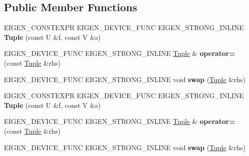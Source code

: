 \subsection*{Public Member Functions}
\begin{DoxyCompactItemize}
\item 
\mbox{\label{struct_eigen_1_1_tuple_a735678943e6123e4563fa87dbf0314f0}} 
E\+I\+G\+E\+N\+\_\+\+C\+O\+N\+S\+T\+E\+X\+PR E\+I\+G\+E\+N\+\_\+\+D\+E\+V\+I\+C\+E\+\_\+\+F\+U\+NC E\+I\+G\+E\+N\+\_\+\+S\+T\+R\+O\+N\+G\+\_\+\+I\+N\+L\+I\+NE {\bfseries Tuple} (const U \&f, const V \&s)
\item 
\mbox{\label{struct_eigen_1_1_tuple_a9bad774fdccb8664c0dc2a4ff05b11d4}} 
E\+I\+G\+E\+N\+\_\+\+D\+E\+V\+I\+C\+E\+\_\+\+F\+U\+NC E\+I\+G\+E\+N\+\_\+\+S\+T\+R\+O\+N\+G\+\_\+\+I\+N\+L\+I\+NE \hyperlink{struct_eigen_1_1_tuple}{Tuple} \& {\bfseries operator=} (const \hyperlink{struct_eigen_1_1_tuple}{Tuple} \&rhs)
\item 
\mbox{\label{struct_eigen_1_1_tuple_a18d61f9a86ba8627ed39fc38b165a977}} 
E\+I\+G\+E\+N\+\_\+\+D\+E\+V\+I\+C\+E\+\_\+\+F\+U\+NC E\+I\+G\+E\+N\+\_\+\+S\+T\+R\+O\+N\+G\+\_\+\+I\+N\+L\+I\+NE void {\bfseries swap} (\hyperlink{struct_eigen_1_1_tuple}{Tuple} \&rhs)
\item 
\mbox{\label{struct_eigen_1_1_tuple_a735678943e6123e4563fa87dbf0314f0}} 
E\+I\+G\+E\+N\+\_\+\+C\+O\+N\+S\+T\+E\+X\+PR E\+I\+G\+E\+N\+\_\+\+D\+E\+V\+I\+C\+E\+\_\+\+F\+U\+NC E\+I\+G\+E\+N\+\_\+\+S\+T\+R\+O\+N\+G\+\_\+\+I\+N\+L\+I\+NE {\bfseries Tuple} (const U \&f, const V \&s)
\item 
\mbox{\label{struct_eigen_1_1_tuple_a9bad774fdccb8664c0dc2a4ff05b11d4}} 
E\+I\+G\+E\+N\+\_\+\+D\+E\+V\+I\+C\+E\+\_\+\+F\+U\+NC E\+I\+G\+E\+N\+\_\+\+S\+T\+R\+O\+N\+G\+\_\+\+I\+N\+L\+I\+NE \hyperlink{struct_eigen_1_1_tuple}{Tuple} \& {\bfseries operator=} (const \hyperlink{struct_eigen_1_1_tuple}{Tuple} \&rhs)
\item 
\mbox{\label{struct_eigen_1_1_tuple_a18d61f9a86ba8627ed39fc38b165a977}} 
E\+I\+G\+E\+N\+\_\+\+D\+E\+V\+I\+C\+E\+\_\+\+F\+U\+NC E\+I\+G\+E\+N\+\_\+\+S\+T\+R\+O\+N\+G\+\_\+\+I\+N\+L\+I\+NE void {\bfseries swap} (\hyperlink{struct_eigen_1_1_tuple}{Tuple} \&rhs)
\end{DoxyCompactItemize}
